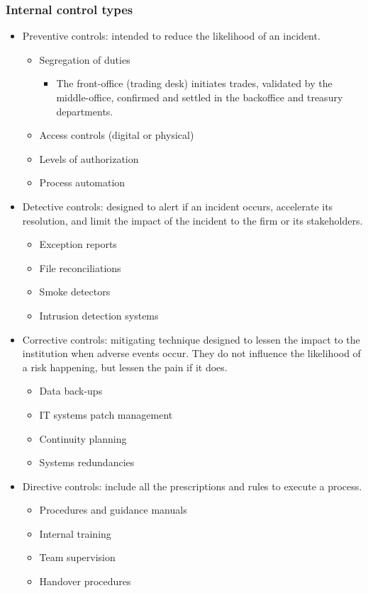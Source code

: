 \subsubsection{Internal control types}
\begin{itemize}
\item Preventive controls: intended to reduce the likelihood of an incident.
    \begin{itemize}
    \item Segregation of duties
        \begin{itemize}
        \item The front-office (trading desk) initiates trades, validated by the middle-office, confirmed and settled in the backoffice and treasury departments.
        \end{itemize}
    \item  Access controls (digital or physical)
    \item  Levels of authorization
    \item  Process automation
    \end{itemize}
\item Detective controls: designed to alert if an incident occurs, accelerate its resolution, and limit the impact of the incident to the firm or its stakeholders.
    \begin{itemize}
    \item Exception reports
    \item  File reconciliations
    \item  Smoke detectors
    \item  Intrusion detection systems
    \end{itemize}


\item Corrective controls: mitigating technique designed to lessen the impact to the institution when adverse events occur. They do not influence the likelihood of a risk happening, but lessen the pain if it does.
    \begin{itemize}
    \item  Data back-ups
    \item  IT systems patch management
    \item  Continuity planning
    \item  Systems redundancies
    
    \end{itemize}
\item Directive controls: include all the prescriptions and rules to execute a process.
    \begin{itemize}
    \item Procedures and guidance manuals
    \item  Internal training
    \item  Team supervision
    \item  Handover procedures
    \end{itemize}
\end{itemize}


